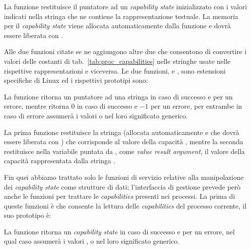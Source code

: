 La funzione restituisce il puntatore ad un \textit{capability state}
inizializzato con i valori indicati nella stringa  che ne
contiene la rappresentazione testuale. La memoria per il \textit{capability
  state} viene allocata automaticamente dalla funzione e dovrà essere liberata
con .

Alle due funzioni citate se ne aggiungono altre due che consentono di
convertire i valori delle costanti di tab.~\ref{tab:proc_capabilities} nelle
stringhe usate nelle rispettive rappresentazioni e viceversa. Le due funzioni,
 e , sono estensioni specifiche di
Linux ed i rispettivi prototipi sono:

\begin{funcproto}{

}

{La funzione  ritorna un puntatore ad una stringa in caso
  di successo e  per un errore, mentre  ritorna
  $0$ in caso di successo e $-1$ per un errore, per entrambe in caso di errore
   assumerà i valori  o  nel loro
  significato generico.  
}
\end{funcproto}

La prima funzione restituisce la stringa (allocata automaticamente e che dovrà
essere liberata con ) che corrisponde al valore della
capacità , mentre la seconda restituisce nella variabile puntata
da , come \textit{value result argument}, il valore della
capacità rappresentata dalla stringa .

Fin quei abbiamo trattato solo le funzioni di servizio relative alla
manipolazione dei \textit{capability state} come strutture di dati;
l'interfaccia di gestione prevede però anche le funzioni per trattare le
\textit{capabilities} presenti nei processi. La prima di queste funzioni è
 che consente la lettura delle \textit{capabilities} del
processo corrente, il suo prototipo è:

\begin{funcproto}{
}

{La funzione ritorna un \textit{capability state} in caso di successo e
   per un errore, nel qual caso  assumerà i valori
  ,  o  nel loro significato
  generico.}
\end{funcproto}


